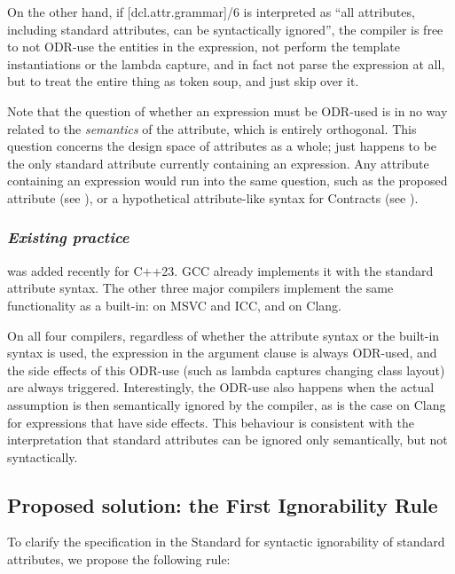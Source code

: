 On the other hand, if [dcl.attr.grammar]/6 is interpreted as ``all attributes, including standard attributes, can be syntactically ignored'', the compiler is free to not ODR-use the entities in the expression, not perform the template instantiations or the lambda capture, and in fact not parse the expression at all, but to treat the entire thing as token soup, and just skip over it.

Note that the question of whether an expression must be ODR-used is in no way related to the \emph{semantics} of the  attribute, which is entirely orthogonal. This question concerns the design space of attributes as a whole;  just happens to be the only standard attribute currently containing an expression. Any attribute containing an expression would run into the same question, such as the proposed  attribute (see \cite{P1144R5}), or a hypothetical attribute-like syntax for Contracts (see \cite{P2487R0}).

\subsubsection*{\emph{Existing practice}}

 was added recently for C++23. GCC already implements it with the standard attribute syntax. The other three major compilers implement the same functionality as a built-in:  on MSVC and ICC, and \mbox{} on Clang.

On all four compilers, regardless of whether the attribute syntax or the built-in syntax is used, the expression in the argument clause is always ODR-used, and the side effects of this ODR-use (such as lambda captures changing class layout) are always triggered. Interestingly, the ODR-use also happens when the actual assumption is then semantically ignored by the compiler, as is the case on Clang for expressions that have side effects. This behaviour is consistent with the interpretation that standard attributes can be ignored only semantically, but not syntactically.

\subsection{Proposed solution: the First Ignorability Rule}
\label{subsec:proposal_syntactic}

To clarify the specification in the Standard for syntactic ignorability of standard attributes, we propose the following rule:

